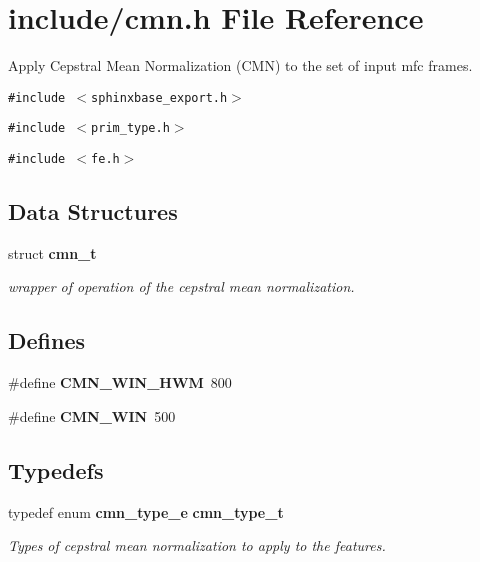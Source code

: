 \section{include/cmn.h File Reference}
\label{cmn_8h}
Apply Cepstral Mean Normalization (CMN) to the set of input mfc frames.  


{\tt \#include $<$sphinxbase\_\-export.h$>$}\par
{\tt \#include $<$prim\_\-type.h$>$}\par
{\tt \#include $<$fe.h$>$}\par
\subsection*{Data Structures}
\begin{CompactItemize}
\item 
struct {\bf cmn\_\-t}
\begin{CompactList}\small\item\em wrapper of operation of the cepstral mean normalization. \item\end{CompactList}\end{CompactItemize}
\subsection*{Defines}
\begin{CompactItemize}
\item 
\#define \textbf{CMN\_\-WIN\_\-HWM}~800\label{cmn_8h_bbf37b74032c295136b4b299ecfcedae}

\item 
\#define \textbf{CMN\_\-WIN}~500\label{cmn_8h_500dafed8351d334da9290ec4f3f6ab3}

\end{CompactItemize}
\subsection*{Typedefs}
\begin{CompactItemize}
\item 
typedef enum {\bf cmn\_\-type\_\-e} {\bf cmn\_\-type\_\-t}\label{cmn_8h_9384c411b10e9db9745cfb550a5c7652}

\begin{CompactList}\small\item\em Types of cepstral mean normalization to apply to the features. \item\end{CompactList}\end{CompactItemize}
